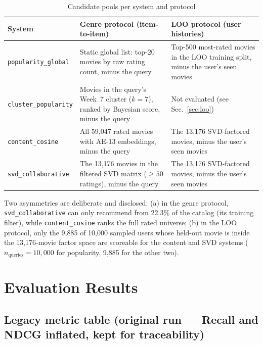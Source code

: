 \documentclass[12pt,a4paper]{article}
\begin{document}
\begin{table}[H]
\centering
\small
\caption{Candidate pools per system and protocol}
\label{tab:candidate_pools}
\begin{tabular}{p{3.4cm}p{5.4cm}p{5.0cm}}
\toprule
\textbf{System} & \textbf{Genre protocol (item-to-item)} & \textbf{LOO protocol (user histories)} \\
\midrule
\texttt{popularity\_global} & Static global list: top-20 movies by raw rating count, minus the query & Top-500 most-rated movies in the LOO training split, minus the user's seen movies \\
\texttt{cluster\_popularity} & Movies in the query's Week~7 cluster ($k=7$), ranked by Bayesian score, minus the query & Not evaluated (see Sec.~\ref{sec:loo}) \\
\texttt{content\_cosine} & All 59,047 rated movies with AE-13 embeddings, minus the query & The 13,176 SVD-factored movies, minus the user's seen movies \\
\texttt{svd\_collaborative} & The 13,176 movies in the filtered SVD matrix ($\geq 50$ ratings), minus the query & The 13,176 SVD-factored movies, minus the user's seen movies \\
\bottomrule
\end{tabular}
\end{table}

Two asymmetries are deliberate and disclosed: (a) in the genre protocol,
\texttt{svd\_collaborative} can only recommend from 22.3\% of the catalog (its training
filter), while \texttt{content\_cosine} ranks the full rated universe; (b) in the LOO
protocol, only the 9,885 of 10,000 sampled users whose held-out movie is inside the
13,176-movie factor space are scoreable for the content and SVD systems
($n_{\text{queries}} = 10{,}000$ for popularity, 9,885 for the other two).

\section{Evaluation Results}
\label{sec:results}

\subsection{Legacy metric table (original run --- Recall and NDCG inflated, kept for traceability)}
\label{subsec:legacy_table}
\end{document}
